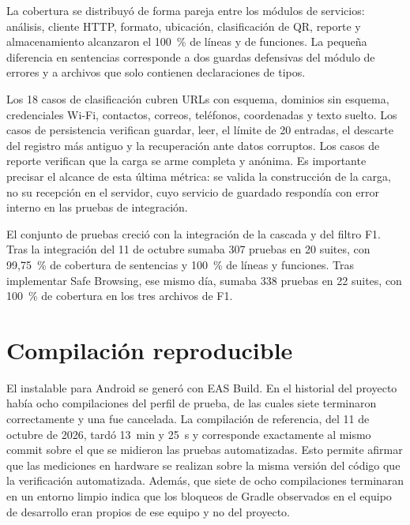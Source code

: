 La cobertura se distribuyó de forma pareja entre los módulos de servicios: análisis, cliente HTTP, formato, ubicación, clasificación de QR, reporte y almacenamiento alcanzaron el 100~\% de líneas y de funciones. La pequeña diferencia en sentencias corresponde a dos guardas defensivas del módulo de errores y a archivos que solo contienen declaraciones de tipos.

Los 18 casos de clasificación cubren URLs con esquema, dominios sin esquema, credenciales Wi-Fi, contactos, correos, teléfonos, coordenadas y texto suelto. Los casos de persistencia verifican guardar, leer, el límite de 20 entradas, el descarte del registro más antiguo y la recuperación ante datos corruptos. Los casos de reporte verifican que la carga se arme completa y anónima. Es importante precisar el alcance de esta última métrica: se valida la construcción de la carga, no su recepción en el servidor, cuyo servicio de guardado respondía con error interno en las pruebas de integración.

El conjunto de pruebas creció con la integración de la cascada y del filtro F1. Tras la integración del 11 de octubre sumaba 307 pruebas en 20 suites, con 99,75~\% de cobertura de sentencias y 100~\% de líneas y funciones. Tras implementar Safe Browsing, ese mismo día, sumaba 338 pruebas en 22 suites, con 100~\% de cobertura en los tres archivos de F1.


\section{Compilación reproducible}

El instalable para Android se generó con EAS Build. En el historial del proyecto había ocho compilaciones del perfil de prueba, de las cuales siete terminaron correctamente y una fue cancelada. La compilación de referencia, del 11 de octubre de 2026, tardó 13~min y 25~s y corresponde exactamente al mismo commit sobre el que se midieron las pruebas automatizadas. Esto permite afirmar que las mediciones en hardware se realizan sobre la misma versión del código que la verificación automatizada. Además, que siete de ocho compilaciones terminaran en un entorno limpio indica que los bloqueos de Gradle observados en el equipo de desarrollo eran propios de ese equipo y no del proyecto.

